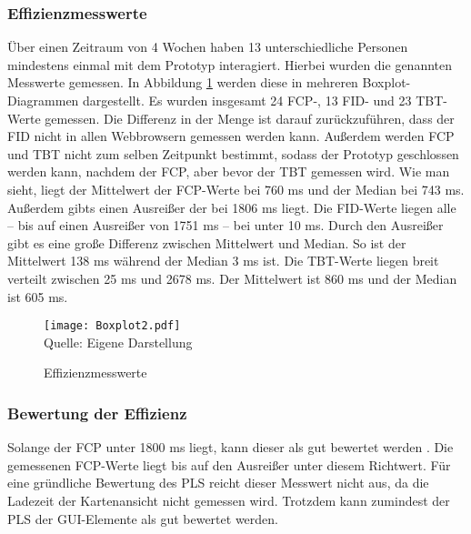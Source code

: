 \subsubsection{Effizienzmesswerte}

Über einen Zeitraum von 4 Wochen haben 13 unterschiedliche Personen mindestens einmal mit dem Prototyp interagiert. Hierbei wurden die genannten Messwerte gemessen. In Abbildung \ref{fig:EfficiencyBoxplot} werden diese in mehreren Boxplot-Diagrammen dargestellt. Es wurden insgesamt 24 \ac{FCP}-, 13 \ac{FID}- und 23 \ac{TBT}-Werte gemessen. Die Differenz in der Menge ist darauf zurückzuführen, dass der \ac{FID} nicht in allen Webbrowsern gemessen werden kann. Außerdem werden \ac{FCP} und \ac{TBT} nicht zum selben Zeitpunkt bestimmt, sodass der Prototyp geschlossen werden kann, nachdem der \ac{FCP}, aber bevor der \ac{TBT} gemessen wird. Wie man sieht, liegt der Mittelwert der \ac{FCP}-Werte bei 760 ms und der Median bei 743 ms. Außerdem gibts einen Ausreißer der bei 1806 ms liegt. Die \ac{FID}-Werte liegen alle – bis auf einen Ausreißer von 1751 ms – bei unter 10 ms. Durch den Ausreißer gibt es eine große Differenz zwischen Mittelwert und Median. So ist der Mittelwert 138 ms während der Median 3 ms ist. Die \ac{TBT}-Werte liegen breit verteilt zwischen 25 ms und 2678 ms. Der Mittelwert ist 860 ms und der Median ist 605 ms.

\begin{figure}[H]
    \caption{Effizienzmesswerte}\label{fig:EfficiencyBoxplot}
    \texttt{[image: Boxplot2.pdf]}
    \\
    Quelle: Eigene Darstellung
\end{figure}


\subsubsection{Bewertung der Effizienz}
Solange der \ac{FCP} unter 1800 ms liegt, kann dieser als gut bewertet werden \cite{FCP}. Die gemessenen \ac{FCP}-Werte liegt bis auf den Ausreißer unter diesem Richtwert. Für eine gründliche Bewertung des \ac{PLS} reicht dieser Messwert nicht aus, da die Ladezeit der Kartenansicht nicht gemessen wird. Trotzdem kann zumindest der \ac{PLS} der \ac{GUI}-Elemente als gut bewertet werden.

